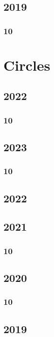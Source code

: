 \documentclass[11pt]{book}
\begin{document}
\section{2019}
\subsection{10}










\chapter{Circles}
\section{2022}
\subsection{10}

\section{2023}
\subsection{10}

\section{2022}

\section{2021}
\subsection{10}

\section{2020}
\subsection{10}

\section{2019} 
\end{document}
